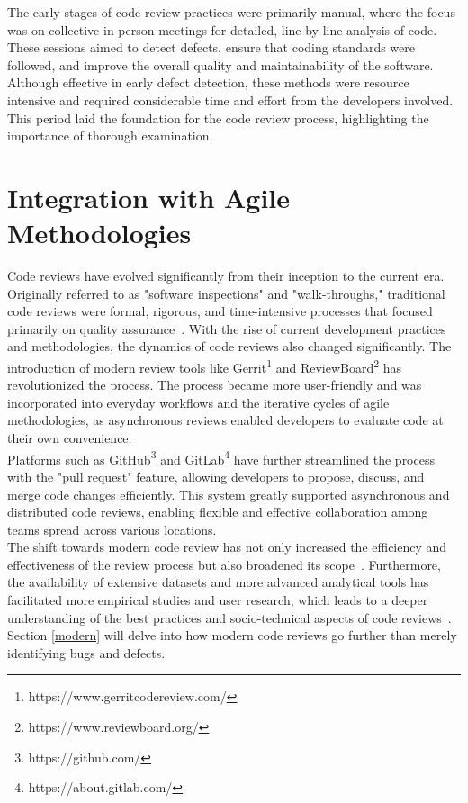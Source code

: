 The early stages of code review practices were primarily manual, where the focus was on collective in-person meetings for detailed, line-by-line analysis of code. These sessions aimed to detect defects, ensure that coding standards were followed, and improve the overall quality and maintainability of the software. Although effective in early defect detection, these methods were resource intensive and required considerable time and effort from the developers involved. This period laid the foundation for the code review process, highlighting the importance of thorough examination.


\section{Integration with Agile Methodologies}
Code reviews have evolved significantly from their inception to the current era. Originally referred to as "software inspections" and "walk-throughs," traditional code reviews were formal, rigorous, and time-intensive processes that focused primarily on quality assurance~\cite{Wang_evolution, Fagan}. With the rise of current development practices and methodologies, the dynamics of code reviews also changed significantly. The introduction of modern review tools like Gerrit\footnote{https://www.gerritcodereview.com/} and ReviewBoard\footnote{https://www.reviewboard.org/} has revolutionized the process. The process became more user-friendly and was incorporated into everyday workflows and the iterative cycles of agile methodologies, as asynchronous reviews enabled developers to evaluate code at their own convenience. \\

Platforms such as GitHub\footnote{https://github.com/} and GitLab\footnote{https://about.gitlab.com/} have further streamlined the process with the "pull request" feature, allowing developers to propose, discuss, and merge code changes efficiently. This system greatly supported asynchronous and distributed code reviews, enabling flexible and effective collaboration among teams spread across various locations. \\

The shift towards modern code review has not only increased the efficiency and effectiveness of the review process but also broadened its scope~\cite{Wang_evolution}. Furthermore, the availability of extensive datasets and more advanced analytical tools has facilitated more empirical studies and user research, which leads to a deeper understanding of the best practices and socio-technical aspects of code reviews~\cite{Agile_Code_Review}. Section \ref{modern} will delve into how modern code reviews go further than merely identifying bugs and defects.


